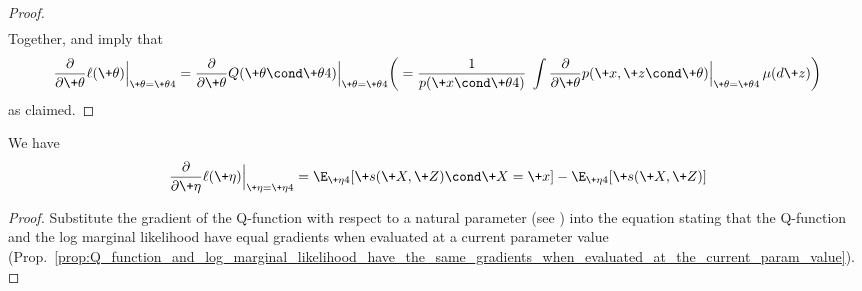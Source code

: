 \documentclass{article} %
\newcommand{\sufficientStatsFunction}{\+s}
\newcommand{\param}{\+\theta}
\newcommand{\naturalParam}{\+\eta}
\begin{document}
\begin{proof}
\begin{align*}
\end{align*}
%
Together,  and  imply that
%
\begin{align*}
\frac{\partial }{\partial \param} \ell(\param) \Bigr|_{\param = \param^^t} = \frac{\partial }{\partial \param} Q(\param \cond \param^^t) \Bigr|_{\param = \param^^t} \bigg( = \frac{1}{p(\+x \cond \param^^t)} \;  \int \frac{\partial}{\partial \param}  p(\+x, \+z \cond \param) \Bigr|_{\param=\param^^t} \, \mu(d\+z) \bigg)
\end{align*}
as claimed.

\end{proof}


\begin{corollary}

We have 
%
\begin{align}
\frac{\partial }{\partial \naturalParam} \ell(\naturalParam) \Bigr|_{\naturalParam = \naturalParam^^t} = \E_{\naturalParam^^t}[\sufficientStatsFunction(\+X,\+Z) \cond \+X=\+x] - 	\E_{\naturalParam^^t}[\sufficientStatsFunction(\+X,\+Z)]
\label{eqn:ordinary_gradient_of_log_marginal_likelihood_of_an_exponential_family_latent_variable_model}
\end{align}
%
\label{cor:ordinary_gradient_of_log_marginal_likelihood_of_an_exponential_family_latent_variable_model}
\end{corollary}

\begin{proof}
Substitute the gradient of the Q-function with respect to a natural parameter (see ) into the equation stating that the Q-function and the log marginal likelihood have equal gradients when evaluated at a current parameter value (Prop.~\ref{prop:Q_function_and_log_marginal_likelihood_have_the_same_gradients_when_evaluated_at_the_current_param_value}).	
\end{proof}
\end{document}
